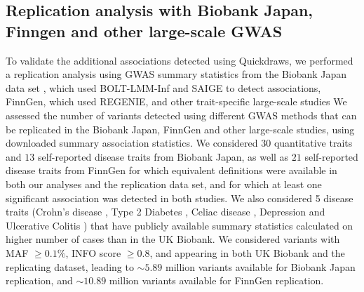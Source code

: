 \clearpage

\subsection{Replication analysis with Biobank Japan, Finngen and other large-scale GWAS}

To validate the additional associations detected using Quickdraws, we performed a replication analysis using GWAS summary statistics from the Biobank Japan data set \cite{nagai2017overview}, which used BOLT-LMM-Inf and SAIGE to detect associations, FinnGen, \cite{kurki2023finngen} which used REGENIE, and other trait-specific large-scale studies \cite{jostins2012host, diabetes2012large, dubois2010multiple, nagel2018meta, de2017genome}
%
We assessed the number of variants detected using different GWAS methods that can be replicated in the Biobank Japan, FinnGen and other large-scale studies, using downloaded summary association statistics.
%
We considered $30$ quantitative traits and $13$ self-reported disease traits from Biobank Japan, as well as $21$ self-reported disease traits from FinnGen for which equivalent definitions were available in both our analyses and the replication data set, and for which at least one significant association was detected in both studies.
%
We also considered 5 disease traits (Crohn's disease \cite{jostins2012host}, Type 2 Diabetes \cite{diabetes2012large}, Celiac disease \cite{dubois2010multiple}, Depression \cite{nagel2018meta} and Ulcerative Colitis \cite{de2017genome}) that have publicly available summary statistics calculated on higher number of cases than in the UK Biobank.
%
We considered variants with MAF $\geq 0.1\%$, INFO score $\geq 0.8$, and appearing in both UK Biobank and the replicating dataset, leading to ${\sim}5.89$ million variants available for Biobank Japan replication, and ${\sim}10.89$ million variants available for FinnGen replication.
%

